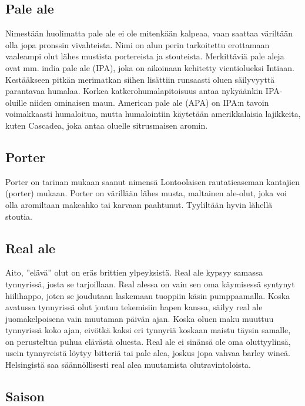 \documentclass[a4paper,11pt]{report}
\begin{document}
\subsection*{Pale ale}

Nimestään huolimatta pale ale ei ole mitenkään kalpeaa, vaan saattaa väriltään olla jopa pronssin vivahteista. Nimi on alun perin tarkoitettu erottamaan vaaleampi olut lähes mustista portereista ja stouteista. Merkittäviä pale aleja ovat mm. india pale ale (IPA), joka on aikoinaan kehitetty vientiolueksi Intiaan. Kestääkseen pitkän merimatkan siihen lisättiin runsaasti oluen säilyvyyttä parantavaa humalaa. Korkea katkerohumalapitoisuus antaa nykyäänkin IPA-oluille niiden ominaisen maun. American pale ale (APA) on IPA:n tavoin voimakkaasti humaloitua, mutta humalointiin käytetään amerikkalaisia lajikkeita, kuten Cascadea, joka antaa oluelle sitrusmaisen aromin.

\subsection*{Porter}

Porter on tarinan mukaan saanut nimensä Lontoolaisen rautatieaseman kantajien (porter) mukaan. Porter on värillään lähes musta, maltainen ale-olut, joka voi olla aromiltaan makeahko tai karvaan paahtunut. Tyyliltään hyvin lähellä stoutia.

\subsection*{Real ale}

Aito, ''elävä'' olut on eräs brittien ylpeyksistä. Real ale kypsyy samassa tynnyrissä, josta se tarjoillaan. Real alessa on vain sen oma käymisessä syntynyt hiilihappo, joten se joudutaan laskemaan tuoppiin käsin pumppaamalla. Koska avatussa tynnyrissä olut joutuu tekemisiin hapen kanssa, säilyy real ale juomakelpoisena vain muutaman päivän ajan. Koska oluen maku muuttuu tynnyrissä koko ajan, eivötkä kaksi eri tynnyriä koskaan maistu täysin samalle, on perusteltua puhua elävästä oluesta. Real ale ei sinänsä ole oma oluttyylinsä, usein tynnyreistä löytyy bitteriä tai pale alea, joskus jopa vahvaa barley wineä. Helsingistä saa säännöllisesti real alea muutamista olutravintoloista.

\subsection*{Saison}
\end{document}

